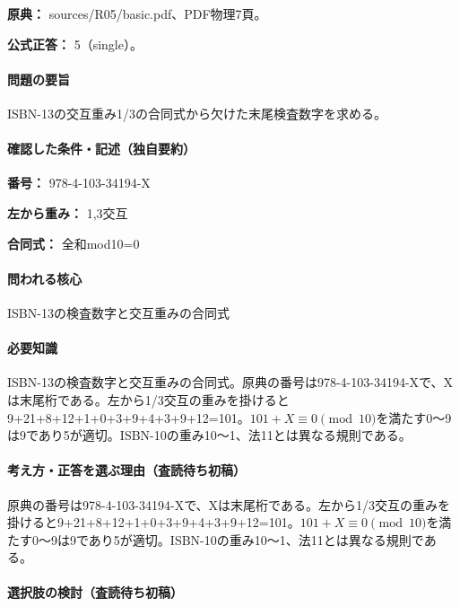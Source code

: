 \noindent\textbf{原典：} sources/R05/basic.pdf、PDF物理7頁。

\textbf{公式正答：} 5（single）。

\paragraph{問題の要旨} ISBN-13の交互重み1/3の合同式から欠けた末尾検査数字を求める。

\paragraph{確認した条件・記述（独自要約）}\mbox{}\par

\noindent\textbf{番号：} 978-4-103-34194-X\par

\noindent\textbf{左から重み：} 1,3交互\par

\noindent\textbf{合同式：} 全和mod10=\allowbreak{}0\par

\paragraph{問われる核心} ISBN-13の検査数字と交互重みの合同式

\paragraph{必要知識} ISBN-13の検査数字と交互重みの合同式。原典の番号は978-4-103-34194-Xで、Xは末尾桁である。左から1/3交互の重みを掛けると9+21+8+12+1+0+3+9+4+3+9+12=\allowbreak{}101。\(101+X\equiv0\pmod{10}\)を満たす0〜9は9であり5が適切。ISBN-10の重み10〜1、法11とは異なる規則である。

\paragraph{考え方・正答を選ぶ理由（査読待ち初稿）} 原典の番号は978-4-103-34194-Xで、Xは末尾桁である。左から1/3交互の重みを掛けると9+21+8+12+1+0+3+9+4+3+9+12=\allowbreak{}101。\(101+X\equiv0\pmod{10}\)を満たす0〜9は9であり5が適切。ISBN-10の重み10〜1、法11とは異なる規則である。

\paragraph{選択肢の検討（査読待ち初稿）}\mbox{}\par

